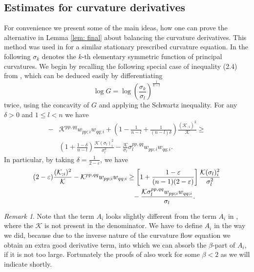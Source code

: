 \documentclass{amsart}
\theoremstyle{definition}
\theoremstyle{remark}
\newtheorem{remark}[theorem]{Remark}
\numberwithin{equation}{section}
\begin{document}
\subsection*{Estimates for curvature derivatives}
For convenience we present some of the main ideas, how one can prove the alternative in Lemma \ref{lem: final} about balancing the curvature derivatives. This method was used in \cite{Guan} for a similar stationary prescribed curvature equation.
In the following $\sigma_k$ denotes the $k$-th elementary symmetric function of principal curvatures. We begin by recalling the following special case of inequality (2.4) from \cite[Lemma 2.2]{Guan}, which can be deduced easily by differentiating
\[\log G=\log \left(\frac{\sigma_k}{\sigma_l}\right)^{\frac{1}{k-l}}\] twice, using the concavity of $G$ and applying the Schwartz inequality.
For any $\delta>0$ and $1\leq l<n$ we have
\begin{align*}
-&\mathcal{K}^{pp,qq}w_{pp;i}w_{qq;i}+\left(1-\frac{1}{n-l}+\frac{1}{(n-l)\delta}\right)\frac{(\mathcal{K}_{;i})^2}{\mathcal{K}}\geq \\
&\left(1+\frac{1-\delta}{n-l}\right)\frac{\mathcal{K}(\sigma_l)_i^2}{\sigma_l^2}-\frac{\mathcal{K}}{\sigma_l}\sigma_l^{pp,qq}w_{pp;i}w_{qq;i}.
\end{align*}
In particular, by taking $\delta=\frac{1}{2-\varepsilon}$, we have
\begin{align}\begin{split}\label{key ineq}
(2-\varepsilon)\frac{(\mathcal{K}_{;i})^2}{\mathcal{K}}-\mathcal{K}^{pp,qq}w_{pp;i}w_{qq;i}&\geq \left[1+\frac{1-\varepsilon}{(n-1)(2-\varepsilon)}\right]\frac{\mathcal{K}(\sigma_l)_i^2}{\sigma_l^2}\\
					&\hphantom{=}-\frac{\mathcal{K}\sigma_l^{pp,qq}w_{pp;i}w_{qq;i}}{\sigma_l}.
\end{split}\end{align}



\begin{remark}
Note that the term $A_i$ looks slightly different from the term $A_i$ in \cite{Guan}, where the $\mathcal{K}$ is not present in the denominator. We have to define $A_i$ in the way we did, because due to the inverse nature of the curvature flow equation we obtain an extra good derivative term, into which we can absorb the $\beta$-part of $A_i$, if it is not too large. Fortunately the proofs of \cite[Lemma~4.2, Lemma~4.3]{Guan} also work for some $\beta<2$ as we will indicate shortly.
\end{remark}
\end{document}
